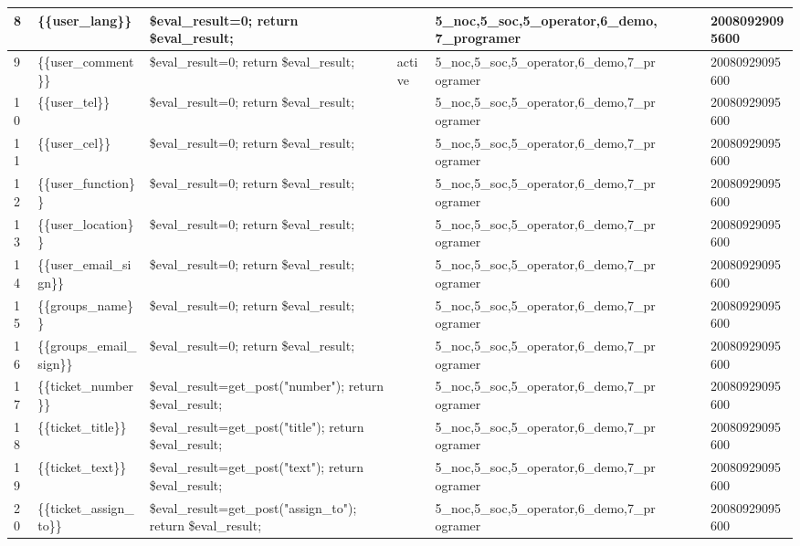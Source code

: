 \begin{longtable}{|l|l|l|l|l|l|l|l|l|}
8 & \{\{user\_lang\}\} & \$eval\_result=0;
return \$eval\_result; &  & 5\_noc,5\_soc,5\_operator,6\_demo,7\_programer &  &  &  & 20080929095600 \\ \hline 
9 & \{\{user\_comment\}\} & \$eval\_result=0;
return \$eval\_result; & active & 5\_noc,5\_soc,5\_operator,6\_demo,7\_programer &  &  &  & 20080929095600 \\ \hline 
10 & \{\{user\_tel\}\} & \$eval\_result=0;
return \$eval\_result; &  & 5\_noc,5\_soc,5\_operator,6\_demo,7\_programer &  &  &  & 20080929095600 \\ \hline 
11 & \{\{user\_cel\}\} & \$eval\_result=0;
return \$eval\_result; &  & 5\_noc,5\_soc,5\_operator,6\_demo,7\_programer &  &  &  & 20080929095600 \\ \hline 
12 & \{\{user\_function\}\} & \$eval\_result=0;
return \$eval\_result; &  & 5\_noc,5\_soc,5\_operator,6\_demo,7\_programer &  &  &  & 20080929095600 \\ \hline 
13 & \{\{user\_location\}\} & \$eval\_result=0;
return \$eval\_result; &  & 5\_noc,5\_soc,5\_operator,6\_demo,7\_programer &  &  &  & 20080929095600 \\ \hline 
14 & \{\{user\_email\_sign\}\} & \$eval\_result=0;
return \$eval\_result; &  & 5\_noc,5\_soc,5\_operator,6\_demo,7\_programer &  &  &  & 20080929095600 \\ \hline 
15 & \{\{groups\_name\}\} & \$eval\_result=0;
return \$eval\_result; &  & 5\_noc,5\_soc,5\_operator,6\_demo,7\_programer &  &  &  & 20080929095600 \\ \hline 
16 & \{\{groups\_email\_sign\}\} & \$eval\_result=0;
return \$eval\_result; &  & 5\_noc,5\_soc,5\_operator,6\_demo,7\_programer &  &  &  & 20080929095600 \\ \hline 
17 & \{\{ticket\_number\}\} & \$eval\_result=get\_post("number");
return \$eval\_result; &  & 5\_noc,5\_soc,5\_operator,6\_demo,7\_programer &  &  &  & 20080929095600 \\ \hline 
18 & \{\{ticket\_title\}\} & \$eval\_result=get\_post("title");
return \$eval\_result; &  & 5\_noc,5\_soc,5\_operator,6\_demo,7\_programer &  &  &  & 20080929095600 \\ \hline 
19 & \{\{ticket\_text\}\} & \$eval\_result=get\_post("text");
return \$eval\_result; &  & 5\_noc,5\_soc,5\_operator,6\_demo,7\_programer &  &  &  & 20080929095600 \\ \hline 
20 & \{\{ticket\_assign\_to\}\} & \$eval\_result=get\_post("assign\_to");
return \$eval\_result; &  & 5\_noc,5\_soc,5\_operator,6\_demo,7\_programer &  &  &  & 20080929095600 \\ \hline 

\end{longtable}
